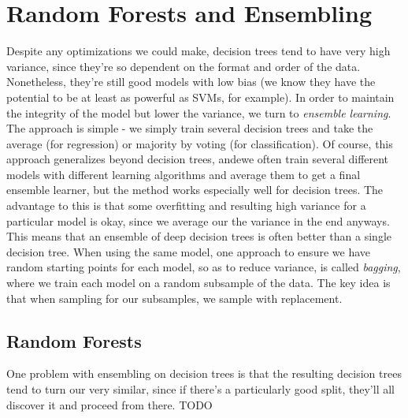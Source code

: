 \documentclass{article}
\begin{document}
\section{Random Forests and Ensembling}
Despite any optimizations we could make, decision trees tend to have very high variance, since they're so dependent on the format and order of the data. Nonetheless, they're still good models with low bias (we know they have the potential to be at least as powerful as SVMs, for example). In order to maintain the integrity of the model but lower the variance, we turn to \textit{ensemble learning}. The approach is simple - we simply train several decision trees and take the average (for regression) or majority by voting (for classification). Of course, this approach generalizes beyond decision trees, andewe often train several different models with different learning algorithms and average them to get a final ensemble learner, but the method works especially well for decision trees. The advantage to this is that some overfitting and resulting high variance for a particular model is okay, since we average our the variance in the end anyways. This means that an ensemble of deep decision trees is often better than a single decision tree.
\newline
When using the same model, one approach to ensure we have random starting points for each model, so as to reduce variance, is called \textit{bagging}, where we train each model on a random subsample of the data. The key idea is that when sampling for our subsamples, we sample with replacement.

\subsection{Random Forests}
One problem with ensembling on decision trees is that the resulting decision trees tend to turn our very similar, since if there's a particularly good split, they'll all discover it and proceed from there. TODO
\end{document}
